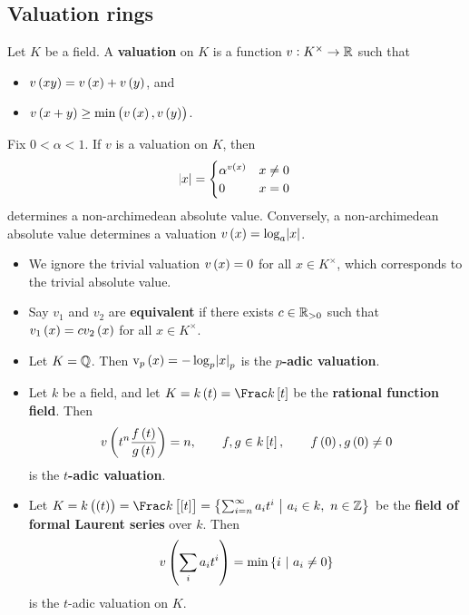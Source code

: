 \subsection{Valuation rings}

\begin{definition}
Let $ K $ be a field. A \textbf{valuation} on $ K $ is a function $ v : K^\times \to \mathbb{R} $ such that
\begin{itemize}
\item $ v\br{xy} = v\br{x} + v\br{y} $, and
\item $ v\br{x + y} \ge \min\br{v\br{x}, v\br{y}} $.
\end{itemize}
\end{definition}

Fix $ 0 < \alpha < 1 $. If $ v $ is a valuation on $ K $, then
$$ \abs{x} =
\begin{cases}
\alpha^{v\br{x}} & x \ne 0 \\
0 & x = 0
\end{cases}
$$
determines a non-archimedean absolute value. Conversely, a non-archimedean absolute value determines a valuation $ v\br{x} = \log_a \abs{x} $.

\begin{remark*}
\hfill
\begin{itemize}
\item We ignore the trivial valuation $ v\br{x} = 0 $ for all $ x \in K^\times $, which corresponds to the trivial absolute value.
\item Say $ v_1 $ and $ v_2 $ are \textbf{equivalent} if there exists $ c \in \mathbb{R}_{> 0} $ such that $ v_1\br{x} = cv_2\br{x} $ for all $ x \in K^\times $.
\end{itemize}
\end{remark*}

\pagebreak

\begin{example*}
\hfill
\begin{itemize}
\item Let $ K = \mathbb{Q} $. Then $ \v_p\br{x} = -\log_p \abs{x}_p $ is the \textbf{$ p $-adic valuation}.
\item Let $ k $ be a field, and let $ K = k\br{t} = \Frac k\sbr{t} $ be the \textbf{rational function field}. Then
$$ v\br{t^n\dfrac{f\br{t}}{g\br{t}}} = n, \qquad f, g \in k\sbr{t}, \qquad f\br{0}, g\br{0} \ne 0 $$
is the \textbf{$ t $-adic valuation}.
\item Let $ K = k\br{\br{t}} = \Frac k\sbr{\sbr{t}} = \cbr{\sum_{i = n}^\infty a_it^i \st a_i \in k, \ n \in \ZZ} $ be the \textbf{field of formal Laurent series} over $ k $. Then
$$ v\br{\sum_i a_it^i} = \min \cbr{i \st a_i \ne 0} $$
is the $ t $-adic valuation on $ K $.
\end{itemize}
\end{example*}

